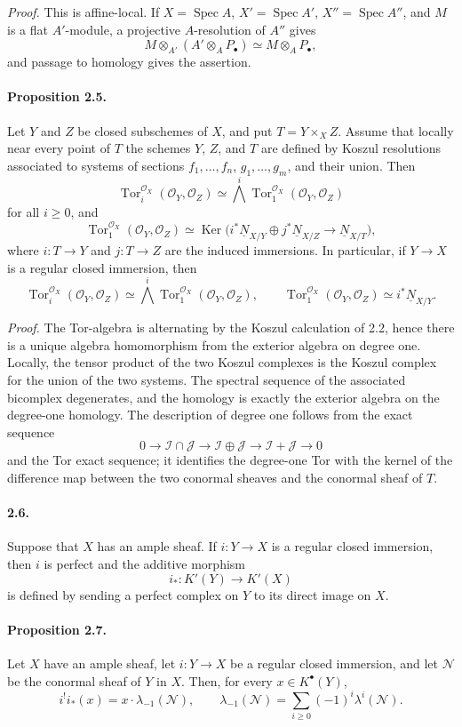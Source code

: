\documentclass[12pt]{article}
\newcommand{\cO}{\mathcal O}
\newcommand{\cI}{\mathcal I}
\newcommand{\cJ}{\mathcal J}
\newcommand{\uN}{\mathcal N}
\newcommand{\Kdot}{K^{\bullet}}
\newcommand{\Tor}{\operatorname{Tor}}
\newcommand{\Spec}{\operatorname{Spec}}
\newcommand{\Ker}{\operatorname{Ker}}
\begin{document}
\emph{Proof.} This is affine-local. If $X=\Spec A$, $X'=\Spec A'$, $X''=\Spec A''$, and $M$ is a flat $A'$-module, a projective $A$-resolution of $A''$ gives
\[
M\otimes_{A'}(A'\otimes_AP_\bullet)\simeq M\otimes_AP_\bullet,
\]
and passage to homology gives the assertion.

\paragraph{Proposition 2.5.} Let $Y$ and $Z$ be closed subschemes of $X$, and put $T=Y\times_X Z$. Assume that locally near every point of $T$ the schemes $Y$, $Z$, and $T$ are defined by Koszul resolutions associated to systems of sections $f_1,\ldots,f_n$, $g_1,\ldots,g_m$, and their union. Then
\[
\Tor_i^{\cO_X}(\cO_Y,\cO_Z)\simeq \bigwedge^i\Tor_1^{\cO_X}(\cO_Y,\cO_Z)
\]
for all $i\geq0$, and
\[
\Tor_1^{\cO_X}(\cO_Y,\cO_Z)
\simeq \Ker\bigl(i^*\underline N_{X/Y}\oplus j^*\underline N_{X/Z}\to\underline N_{X/T}\bigr),
\]
where $i:T\to Y$ and $j:T\to Z$ are the induced immersions. In particular, if $Y\to X$ is a regular closed immersion, then
\[
\Tor_i^{\cO_X}(\cO_Y,\cO_Z)\simeq \bigwedge^i\Tor_1^{\cO_X}(\cO_Y,\cO_Z),
\qquad
\Tor_1^{\cO_X}(\cO_Y,\cO_Z)\simeq i^*\underline N_{X/Y}.
\]

\emph{Proof.} The Tor-algebra is alternating by the Koszul calculation of 2.2, hence there is a unique algebra homomorphism from the exterior algebra on degree one. Locally, the tensor product of the two Koszul complexes is the Koszul complex for the union of the two systems. The spectral sequence of the associated bicomplex degenerates, and the homology is exactly the exterior algebra on the degree-one homology. The description of degree one follows from the exact sequence
\[
0\to\cI\cap\cJ\to\cI\oplus\cJ\to\cI+\cJ\to0
\]
and the Tor exact sequence; it identifies the degree-one Tor with the kernel of the difference map between the two conormal sheaves and the conormal sheaf of $T$.

\paragraph{2.6.} Suppose that $X$ has an ample sheaf. If $i:Y\to X$ is a regular closed immersion, then $i$ is perfect and the additive morphism
\[
i_*:K'(Y)\to K'(X)
\]
is defined by sending a perfect complex on $Y$ to its direct image on $X$.

\paragraph{Proposition 2.7.} Let $X$ have an ample sheaf, let $i:Y\to X$ be a regular closed immersion, and let $\uN$ be the conormal sheaf of $Y$ in $X$. Then, for every $x\in\Kdot(Y)$,
\[
i^!i_*(x)=x\cdot\lambda_{-1}(\uN),
\qquad
\lambda_{-1}(\uN)=\sum_{i\geq0}(-1)^i\lambda^i(\uN).
\]
\end{document}
